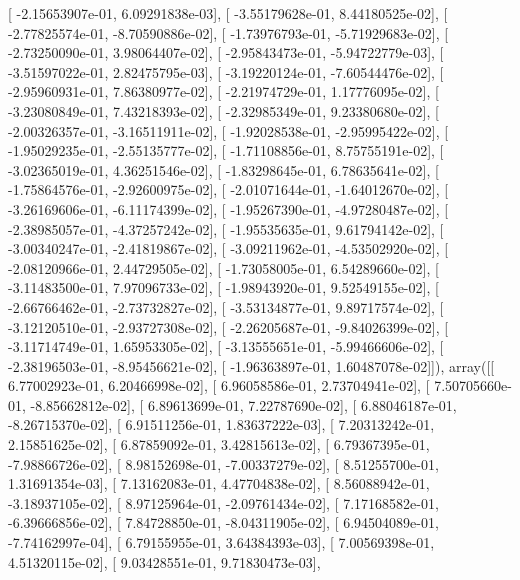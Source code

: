 \documentclass{article}
\begin{document}
       [ -2.15653907e-01,   6.09291838e-03],
       [ -3.55179628e-01,   8.44180525e-02],
       [ -2.77825574e-01,  -8.70590886e-02],
       [ -1.73976793e-01,  -5.71929683e-02],
       [ -2.73250090e-01,   3.98064407e-02],
       [ -2.95843473e-01,  -5.94722779e-03],
       [ -3.51597022e-01,   2.82475795e-03],
       [ -3.19220124e-01,  -7.60544476e-02],
       [ -2.95960931e-01,   7.86380977e-02],
       [ -2.21974729e-01,   1.17776095e-02],
       [ -3.23080849e-01,   7.43218393e-02],
       [ -2.32985349e-01,   9.23380680e-02],
       [ -2.00326357e-01,  -3.16511911e-02],
       [ -1.92028538e-01,  -2.95995422e-02],
       [ -1.95029235e-01,  -2.55135777e-02],
       [ -1.71108856e-01,   8.75755191e-02],
       [ -3.02365019e-01,   4.36251546e-02],
       [ -1.83298645e-01,   6.78635641e-02],
       [ -1.75864576e-01,  -2.92600975e-02],
       [ -2.01071644e-01,  -1.64012670e-02],
       [ -3.26169606e-01,  -6.11174399e-02],
       [ -1.95267390e-01,  -4.97280487e-02],
       [ -2.38985057e-01,  -4.37257242e-02],
       [ -1.95535635e-01,   9.61794142e-02],
       [ -3.00340247e-01,  -2.41819867e-02],
       [ -3.09211962e-01,  -4.53502920e-02],
       [ -2.08120966e-01,   2.44729505e-02],
       [ -1.73058005e-01,   6.54289660e-02],
       [ -3.11483500e-01,   7.97096733e-02],
       [ -1.98943920e-01,   9.52549155e-02],
       [ -2.66766462e-01,  -2.73732827e-02],
       [ -3.53134877e-01,   9.89717574e-02],
       [ -3.12120510e-01,  -2.93727308e-02],
       [ -2.26205687e-01,  -9.84026399e-02],
       [ -3.11714749e-01,   1.65953305e-02],
       [ -3.13555651e-01,  -5.99466606e-02],
       [ -2.38196503e-01,  -8.95456621e-02],
       [ -1.96363897e-01,   1.60487078e-02]]), array([[  6.77002923e-01,   6.20466998e-02],
       [  6.96058586e-01,   2.73704941e-02],
       [  7.50705660e-01,  -8.85662812e-02],
       [  6.89613699e-01,   7.22787690e-02],
       [  6.88046187e-01,  -8.26715370e-02],
       [  6.91511256e-01,   1.83637222e-03],
       [  7.20313242e-01,   2.15851625e-02],
       [  6.87859092e-01,   3.42815613e-02],
       [  6.79367395e-01,  -7.98866726e-02],
       [  8.98152698e-01,  -7.00337279e-02],
       [  8.51255700e-01,   1.31691354e-03],
       [  7.13162083e-01,   4.47704838e-02],
       [  8.56088942e-01,  -3.18937105e-02],
       [  8.97125964e-01,  -2.09761434e-02],
       [  7.17168582e-01,  -6.39666856e-02],
       [  7.84728850e-01,  -8.04311905e-02],
       [  6.94504089e-01,  -7.74162997e-04],
       [  6.79155955e-01,   3.64384393e-03],
       [  7.00569398e-01,   4.51320115e-02],
       [  9.03428551e-01,   9.71830473e-03],
\end{document}
